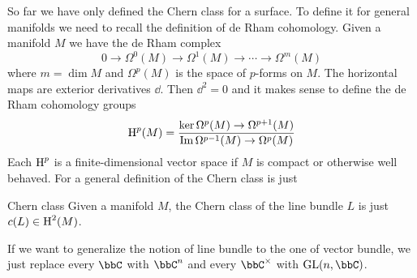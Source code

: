 So far we have only defined the Chern class for a surface. To define it for general manifolds we need to recall the definition of de Rham cohomology. Given a manifold $M$ we have the de Rham complex 
\begin{equation}
    0\rightarrow \Omega^0(M)\rightarrow \Omega^1(M)\rightarrow \cdots \rightarrow \Omega^m(M)
\end{equation}
where $m=\dim M$ and $\Omega^p(M)$ is the space of $p$-forms on $M$. The horizontal maps are exterior derivatives $\dd$. Then $\dd^2=0$ and it makes sense to define the de Rham cohomology groups 
\begin{equation}
    \HH^p(M)=\frac{\ker\Omega^p(M)\rightarrow \Omega^{p+1}(M)}{\Im \Omega^{p-1}(M)\rightarrow \Omega^p(M)}
\end{equation}
Each $\operatorname{H}^p$ is a finite-dimensional vector space if $M$ is compact or otherwise well behaved. For a general definition of the Chern class is just 
\begin{defn}{Chern class}{}
    Given a manifold $M$, the Chern class of the line bundle $L$ is just $c(L)\in \operatorname{H}^2(M)$.
\end{defn}

If we want to generalize the notion of line bundle to the one of vector bundle, we just replace every $\bbC$ with $\bbC^n$ and every $\bbC^\times$ with $\rm{GL}(n,\bbC)$.